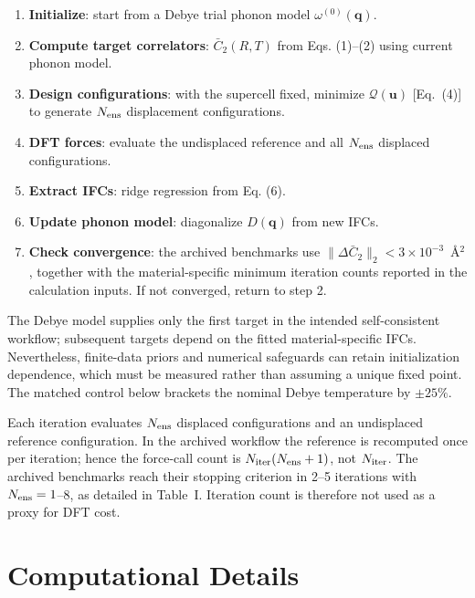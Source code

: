 \documentclass[aps,prb,reprint,amsmath,amssymb,floatfix]{revtex4-2}
\providecommand{\tightlist}{\setlength{\itemsep}{0pt}\setlength{\parskip}{0pt}}
\begin{document}
\color{revisionblue}
\begin{enumerate}
\def\labelenumi{\arabic{enumi}.}
\tightlist
\item
  \textbf{Initialize}: start from a Debye trial phonon model
  \(\omega^{(0)}(\mathbf{q})\).
\item
  \textbf{Compute target correlators}: \(\bar{C}_2(R,T)\) from Eqs.
  (1)--(2) using current phonon model.
\item
  \textbf{Design configurations}: with the supercell fixed,
  minimize \(\mathcal Q(\mathbf u)\) [Eq.~(4)] to generate
  \(N_{\rm ens}\) displacement configurations.
\item
  \textbf{DFT forces}: evaluate the undisplaced reference
  and all \(N_{\rm ens}\) displaced configurations.
\item
  \textbf{Extract IFCs}: ridge regression from Eq. (6).
\item
  \textbf{Update phonon model}: diagonalize \(D(\mathbf{q})\) from new
  IFCs.
\item
  \textbf{Check convergence}: the archived benchmarks use
  \(\|\Delta\bar C_2\|_2<3\times10^{-3}\)~Å\(^2\), together with the
  material-specific minimum iteration counts reported in the calculation
  inputs. If not converged, return to step 2.
\end{enumerate}
\color{black}

\color{revisionblue}
The Debye model supplies only the first target in the intended
self-consistent workflow; subsequent targets depend on the fitted
material-specific IFCs. Nevertheless, finite-data priors and numerical
safeguards can retain initialization dependence, which must be measured rather
than assuming a unique fixed point. The matched control below brackets the
nominal Debye temperature by $\pm25\%$.
\color{black}

\color{revisionblue}
Each iteration evaluates \(N_{\rm ens}\) displaced configurations and an
undisplaced reference configuration. In the archived workflow the
reference is recomputed once per iteration; hence the force-call count is
\(N_{\rm iter}(N_{\rm ens}+1)\), not \(N_{\rm iter}\). The archived benchmarks
reach their stopping criterion in 2--5 iterations with
\(N_{\rm ens}=1\)--8, as detailed in Table~I. Iteration count is therefore not
used as a proxy for DFT cost.
\color{black}

\section{Computational Details}\label{computational-details}
\end{document}
